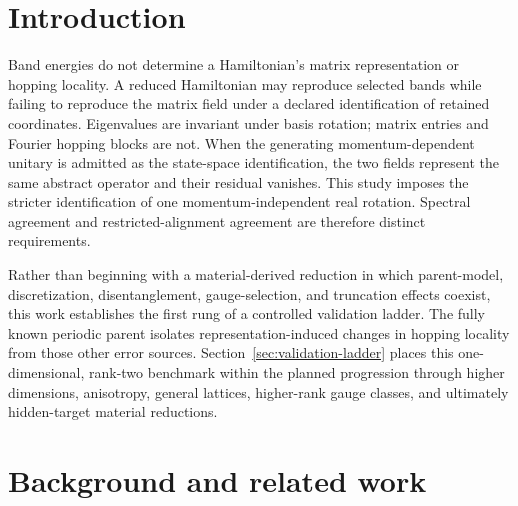 \documentclass[aps,prb,reprint,amsmath,amssymb,longbibliography,floatfix]{revtex4-2}
\begin{document}
\section{Introduction}

Band energies do not determine a Hamiltonian's matrix representation or hopping
locality. A reduced Hamiltonian may reproduce selected bands while failing to reproduce
the matrix field under a declared identification of retained coordinates. Eigenvalues
are invariant under basis rotation; matrix entries and Fourier hopping blocks are not.
When the generating momentum-dependent unitary is admitted as the state-space
identification, the two fields represent the same abstract operator and their residual
vanishes. This study imposes the stricter identification of one momentum-independent
real rotation. Spectral agreement and restricted-alignment agreement are therefore
distinct requirements.

Rather than beginning with a material-derived reduction in which parent-model,
discretization, disentanglement, gauge-selection, and truncation effects coexist, this
work establishes the first rung of a controlled validation ladder. The fully known
periodic parent isolates representation-induced changes in hopping locality from those
other error sources. Section~\ref{sec:validation-ladder} places this one-dimensional,
rank-two benchmark within the planned progression through higher dimensions,
anisotropy, general lattices, higher-rank gauge classes, and ultimately hidden-target
material reductions.

\section{Background and related work}
\end{document}

